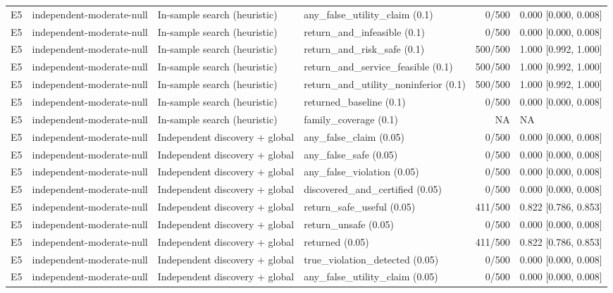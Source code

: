 \begin{longtable}{p{.04\linewidth}p{.18\linewidth}p{.19\linewidth}p{.16\linewidth}r p{.21\linewidth}}
E5 & independent-moderate-null & In-sample search (heuristic) & any\_false\_utility\_claim (0.1) & 0/500 & 0.000 [0.000, 0.008]\\
E5 & independent-moderate-null & In-sample search (heuristic) & return\_and\_infeasible (0.1) & 0/500 & 0.000 [0.000, 0.008]\\
E5 & independent-moderate-null & In-sample search (heuristic) & return\_and\_risk\_safe (0.1) & 500/500 & 1.000 [0.992, 1.000]\\
E5 & independent-moderate-null & In-sample search (heuristic) & return\_and\_service\_feasible (0.1) & 500/500 & 1.000 [0.992, 1.000]\\
E5 & independent-moderate-null & In-sample search (heuristic) & return\_and\_utility\_noninferior (0.1) & 500/500 & 1.000 [0.992, 1.000]\\
E5 & independent-moderate-null & In-sample search (heuristic) & returned\_baseline (0.1) & 0/500 & 0.000 [0.000, 0.008]\\
E5 & independent-moderate-null & In-sample search (heuristic) & family\_coverage (0.1) & NA & NA\\
E5 & independent-moderate-null & Independent discovery + global & any\_false\_claim (0.05) & 0/500 & 0.000 [0.000, 0.008]\\
E5 & independent-moderate-null & Independent discovery + global & any\_false\_safe (0.05) & 0/500 & 0.000 [0.000, 0.008]\\
E5 & independent-moderate-null & Independent discovery + global & any\_false\_violation (0.05) & 0/500 & 0.000 [0.000, 0.008]\\
E5 & independent-moderate-null & Independent discovery + global & discovered\_and\_certified (0.05) & 0/500 & 0.000 [0.000, 0.008]\\
E5 & independent-moderate-null & Independent discovery + global & return\_safe\_useful (0.05) & 411/500 & 0.822 [0.786, 0.853]\\
E5 & independent-moderate-null & Independent discovery + global & return\_unsafe (0.05) & 0/500 & 0.000 [0.000, 0.008]\\
E5 & independent-moderate-null & Independent discovery + global & returned (0.05) & 411/500 & 0.822 [0.786, 0.853]\\
E5 & independent-moderate-null & Independent discovery + global & true\_violation\_detected (0.05) & 0/500 & 0.000 [0.000, 0.008]\\
E5 & independent-moderate-null & Independent discovery + global & any\_false\_utility\_claim (0.05) & 0/500 & 0.000 [0.000, 0.008]\\

\end{longtable}
